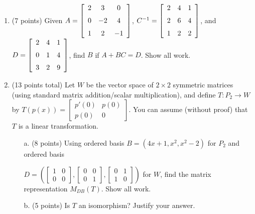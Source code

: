 \documentclass[12pt]{extarticle}
\begin{document}
\begin{enumerate}

  

\item (7 points) Given $A= \left[ \begin {array}{ccc} 2&3&0\\ \noalign{\medskip}0&-2&4
\\ \noalign{\medskip}1&2&-1\end {array} \right] 
$, $C^{-1}= \left[ \begin {array}{ccc} 2&4&1\\ \noalign{\medskip}2&6&4
\\ \noalign{\medskip}1&2&2\end {array} \right] 
$, and $D= \left[ \begin {array}{ccc} 2&4&1\\ \noalign{\medskip}0&1&4
\\ \noalign{\medskip}3&2&9\end {array} \right] 
$, find $B$ if $A+BC=D$. Show all work. %

\newpage

\item (13 points total) Let $W$ be the vector space of $2\times 2$ symmetric matrices (using standard matrix addition/scalar multiplication), and define $T:P_2\to W$ by $T(p(x))=\begin{bmatrix} p'(0) & p(0)\\ p(0) & 0\end{bmatrix}$. You can assume (without proof) that $T$ is a linear transformation.

\begin{itemize}
\item[a.] (8 points) Using ordered basis $B=(4x+1, x^2,x^2-2)$ for $P_2$ and ordered basis 

$D=\left(\begin{bmatrix} 1& 0\\ 0 &0\end{bmatrix}, \begin{bmatrix} 0& 0\\ 0 &1\end{bmatrix}, \begin{bmatrix} 0& 1\\ 1 &0\end{bmatrix}\right)$ for $W$, find the matrix representation $M_{DB}(T)$. Show all work.

\vfill

\item[b.] (5 points) Is $T$ an isomorphism? Justify your answer. 


\end{itemize}
\end{enumerate}
\end{document}
